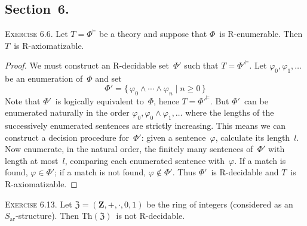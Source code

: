 \documentclass[letterpaper]{article}
\newcommand{\Z}{\mathbf{Z}}
\newcommand{\Zs}{\mathfrak{Z}}
\newcommand{\thr}{\mathrm{Th}}
\theoremstyle{remark}
\begin{document}
\subsection*{Section~6.}
\noindent\textsc{Exercise 6.6.}
Let $T=\Phi^{\models}$ be a theory and suppose that $\Phi$~is R-enumerable. Then $T$~is R-axiomatizable.
\begin{proof}
We must construct an R-decidable set~$\Phi'$ such that $T=\Phi'^{\models}$. Let $\varphi_0,\varphi_1,\ldots$ be an enumeration of~$\Phi$ and set
$$\Phi'=\{\,\varphi_0\land\cdots\land\varphi_n\mid n\ge 0\,\}$$
Note that $\Phi'$~is logically equivalent to~$\Phi$, hence $T=\Phi'^{\models}$. But $\Phi'$~can be enumerated naturally in the order $\varphi_0,\varphi_0\land\varphi_1,\ldots$ where the lengths of the successively enumerated sentences are strictly increasing. This means we can construct a decision procedure for~$\Phi'$: given a sentence~$\varphi$, calculate its length~$l$. Now enumerate, in the natural order, the finitely many sentences of~$\Phi'$ with length at most~$l$, comparing each enumerated sentence with~$\varphi$. If a match is found, $\varphi\in\Phi'$; if a match is not found, $\varphi\not\in\Phi'$. Thus $\Phi'$~is R-decidable and $T$~is R-axiomatizable.
\end{proof}
\noindent\textsc{Exercise 6.13.}
Let $\Zs=(\Z,+,\cdot,0,1)$ be the ring of integers (considered as an $S_{\mathrm{ar}}$-structure). Then $\thr(\Zs)$~is not R-decidable.
\end{document}
